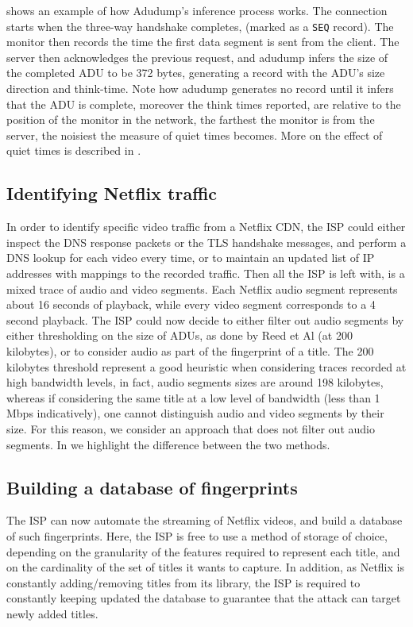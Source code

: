  shows an example of how Adudump's inference process works.
The connection starts when the three-way handshake completes, (marked as a
\texttt{SEQ} record). The monitor then records the time the first data segment
is sent from the client. The server then acknowledges the previous request, and
adudump infers the size of the completed ADU to be 372 bytes, generating a
record with the ADU's size direction and think-time. Note how adudump generates
no record until it infers that the ADU is complete, moreover the think times
reported, are relative to the position of the monitor in the network, the
farthest the monitor is from the server, the noisiest the measure of quiet
times becomes. More on the effect of quiet times is described in
.

\subsection{Identifying Netflix traffic}\label{dns}

In order to identify specific video traffic from a Netflix CDN, the ISP could
either inspect the DNS response packets or the TLS handshake messages, and
perform a DNS lookup for each video every time, or to maintain an updated list
of IP addresses with mappings to the recorded traffic. Then all the ISP is left
with, is a mixed trace of audio and video segments. Each Netflix audio segment
represents about 16 seconds of playback, while every video segment corresponds
to a 4 second playback. The ISP could now decide to either filter out audio
segments by either thresholding on the size of ADUs, as done by Reed et Al (at
200 kilobytes), or to consider audio as part of the fingerprint of a title. The
200 kilobytes threshold represent a good heuristic when considering traces
recorded at high bandwidth levels, in fact, audio segments sizes are around 198
kilobytes, whereas if considering the same title at a low level of bandwidth
(less than 1 Mbps indicatively), one cannot distinguish audio and video
segments by their size. For this reason, we consider an approach that does not
filter out audio segments. In  we highlight the difference
between the two methods.

\subsection{Building a database of fingerprints}

The ISP can now automate the streaming of Netflix videos, and build a database
of such fingerprints. Here, the ISP is free to use a method of storage of
choice, depending on the granularity of the features required to represent each
title, and on the cardinality of the set of titles it wants to capture.  In
addition, as Netflix is constantly adding/removing titles from its library, the
ISP is required to constantly keeping updated the database to guarantee that
the attack can target newly added titles.

